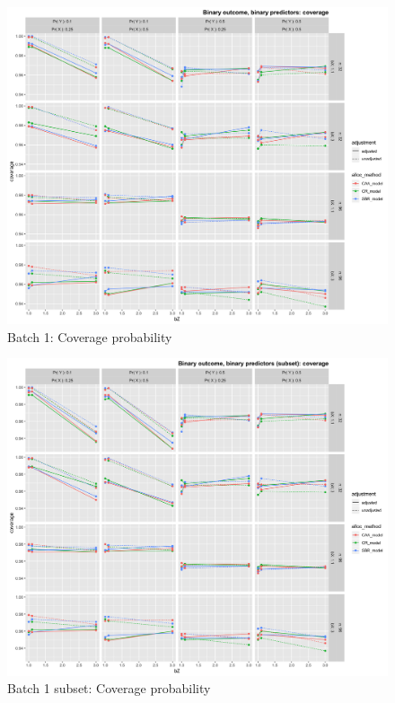 \begin{figure}[H]
	\includegraphics[width=\linewidth]{figures/b1_coverage_all_methods_adj_unadj}
	\caption{Batch 1: Coverage probability}
	\label{fig:b1c}
\end{figure}

\begin{figure}[H]
	\includegraphics[width=\linewidth]{figures/b1_sub_coverage_all_methods_adj_unadj}
	\caption{Batch 1 subset: Coverage probability}
	\label{fig:b1sc}
\end{figure}


